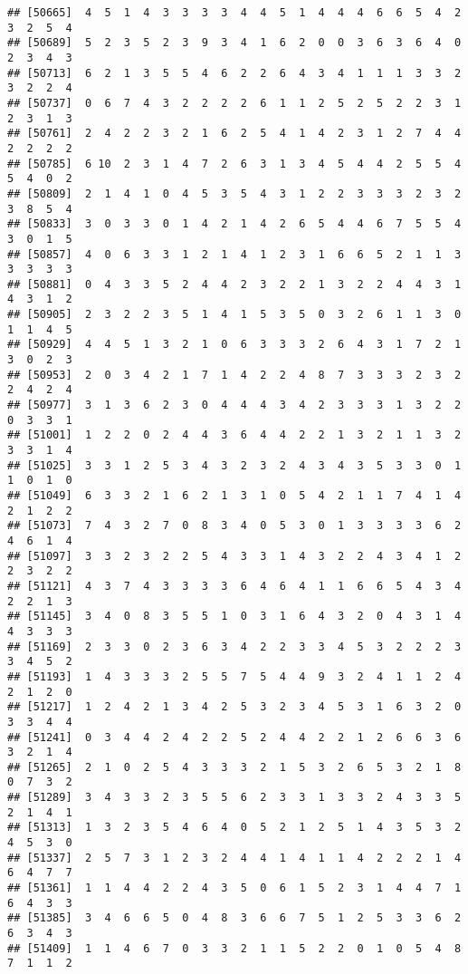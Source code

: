 \documentclass[
]{article}
\begin{document}
\begin{verbatim}
## [50665]  4  5  1  4  3  3  3  3  4  4  5  1  4  4  4  6  6  5  4  2  3  2  5  4
## [50689]  5  2  3  5  2  3  9  3  4  1  6  2  0  0  3  6  3  6  4  0  2  3  4  3
## [50713]  6  2  1  3  5  5  4  6  2  2  6  4  3  4  1  1  1  3  3  2  3  2  2  4
## [50737]  0  6  7  4  3  2  2  2  2  6  1  1  2  5  2  5  2  2  3  1  2  3  1  3
## [50761]  2  4  2  2  3  2  1  6  2  5  4  1  4  2  3  1  2  7  4  4  2  2  2  2
## [50785]  6 10  2  3  1  4  7  2  6  3  1  3  4  5  4  4  2  5  5  4  5  4  0  2
## [50809]  2  1  4  1  0  4  5  3  5  4  3  1  2  2  3  3  3  2  3  2  3  8  5  4
## [50833]  3  0  3  3  0  1  4  2  1  4  2  6  5  4  4  6  7  5  5  4  3  0  1  5
## [50857]  4  0  6  3  3  1  2  1  4  1  2  3  1  6  6  5  2  1  1  3  3  3  3  3
## [50881]  0  4  3  3  5  2  4  4  2  3  2  2  1  3  2  2  4  4  3  1  4  3  1  2
## [50905]  2  3  2  2  3  5  1  4  1  5  3  5  0  3  2  6  1  1  3  0  1  1  4  5
## [50929]  4  4  5  1  3  2  1  0  6  3  3  3  2  6  4  3  1  7  2  1  3  0  2  3
## [50953]  2  0  3  4  2  1  7  1  4  2  2  4  8  7  3  3  3  2  3  2  2  4  2  4
## [50977]  3  1  3  6  2  3  0  4  4  4  3  4  2  3  3  3  1  3  2  2  0  3  3  1
## [51001]  1  2  2  0  2  4  4  3  6  4  4  2  2  1  3  2  1  1  3  2  3  3  1  4
## [51025]  3  3  1  2  5  3  4  3  2  3  2  4  3  4  3  5  3  3  0  1  1  0  1  0
## [51049]  6  3  3  2  1  6  2  1  3  1  0  5  4  2  1  1  7  4  1  4  2  1  2  2
## [51073]  7  4  3  2  7  0  8  3  4  0  5  3  0  1  3  3  3  3  6  2  4  6  1  4
## [51097]  3  3  2  3  2  2  5  4  3  3  1  4  3  2  2  4  3  4  1  2  2  3  2  2
## [51121]  4  3  7  4  3  3  3  3  6  4  6  4  1  1  6  6  5  4  3  4  2  2  1  3
## [51145]  3  4  0  8  3  5  5  1  0  3  1  6  4  3  2  0  4  3  1  4  4  3  3  3
## [51169]  2  3  3  0  2  3  6  3  4  2  2  3  3  4  5  3  2  2  2  3  3  4  5  2
## [51193]  1  4  3  3  3  2  5  5  7  5  4  4  9  3  2  4  1  1  2  4  2  1  2  0
## [51217]  1  2  4  2  1  3  4  2  5  3  2  3  4  5  3  1  6  3  2  0  3  3  4  4
## [51241]  0  3  4  4  2  4  2  2  5  2  4  4  2  2  1  2  6  6  3  6  3  2  1  4
## [51265]  2  1  0  2  5  4  3  3  3  2  1  5  3  2  6  5  3  2  1  8  0  7  3  2
## [51289]  3  4  3  3  2  3  5  5  6  2  3  3  1  3  3  2  4  3  3  5  2  1  4  1
## [51313]  1  3  2  3  5  4  6  4  0  5  2  1  2  5  1  4  3  5  3  2  4  5  3  0
## [51337]  2  5  7  3  1  2  3  2  4  4  1  4  1  1  4  2  2  2  1  4  6  4  7  7
## [51361]  1  1  4  4  2  2  4  3  5  0  6  1  5  2  3  1  4  4  7  1  6  4  3  3
## [51385]  3  4  6  6  5  0  4  8  3  6  6  7  5  1  2  5  3  3  6  2  6  3  4  3
## [51409]  1  1  4  6  7  0  3  3  2  1  1  5  2  2  0  1  0  5  4  8  7  1  1  2

\end{verbatim}
\end{document}
